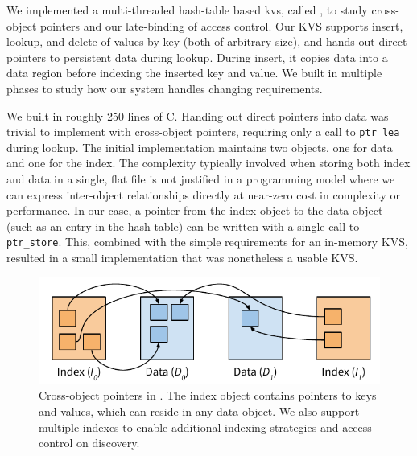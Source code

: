 
\label{sec:kv}

We implemented a multi-threaded hash-table based \ac{kvs}, called \nvkv, to
study cross-object pointers and our late-binding of access control.
Our KVS supports insert, lookup, and delete of values by key (both of arbitrary size), and hands
out direct pointers to persistent data during lookup. During insert, it copies data into a data
region before indexing the inserted key and value. We built \nvkv in multiple phases to study how
our system handles changing requirements.

We built \nvkv in roughly 250 lines of C\@. Handing
out direct pointers into data was trivial to implement with cross-object pointers, requiring
only a call to \texttt{ptr\_lea} during lookup. The initial implementation maintains two
objects, one for data and one for the index.  The complexity typically involved when storing both
index and data in a single, flat file is not justified in a programming
model where we can express inter-object relationships directly at
near-zero cost in complexity or performance. In our case, a pointer from the index object
to the data object (such as an entry in the hash table) can be written with a single call to
\texttt{ptr\_store}.
This, combined with the simple requirements for an in-memory \NVM KVS,
resulted in a small implementation that was nonetheless a
usable KVS.

\begin{figure}
    \centering
    \includegraphics[width=\linewidth]{fig/twzkv}
    \caption{Cross-object pointers in \nvkv. The index object contains pointers to keys and values,
        which can reside in any data object. We also support multiple indexes to enable additional
        indexing strategies and access control on discovery.}
    \label{fig:twzkv}
\end{figure}




